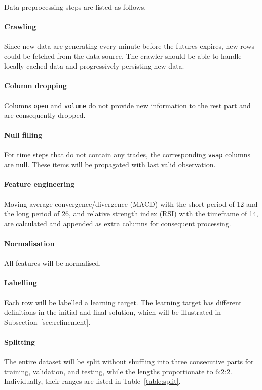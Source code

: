 \documentclass[12pt, letterpaper]{article}
\begin{document}
\paragraph{}
Data preprocessing steps are listed as follows.

\paragraph{Crawling} Since new data are generating every minute before the futures expires, new rows could be fetched from the data source. The crawler should be able to handle locally cached data and progressively persisting new data.

\paragraph{Column dropping} Columns \texttt{open} and \texttt{volume} do not provide new information to the rest part and are consequently dropped.

\paragraph{Null filling} For time steps that do not contain any trades, the corresponding \texttt{vwap} columns are null. These items will be propagated with last valid observation.

\paragraph{Feature engineering} Moving average convergence/divergence (MACD) with the short period of 12 and the long period of 26, and relative strength index (RSI) with the timeframe of 14, are calculated and appended as extra columns for consequent processing.

\paragraph{Normalisation} All features will be normalised.

\paragraph{Labelling} Each row will be labelled a learning target. The learning target has different definitions in the initial and final solution, which will be illustrated in Subsection~\ref{sec:refinement}.

\paragraph{Splitting} The entire dataset will be split without shuffling into three consecutive parts for training, validation, and testing, while the lengths proportionate to 6:2:2. Individually, their ranges are listed in Table~\ref{table:split}.
\end{document}

